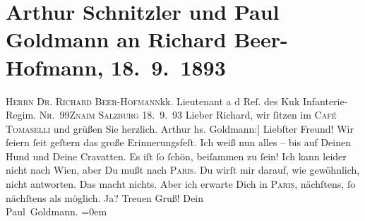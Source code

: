 

         
         \renewcommand{\erwaehntePersonen}{Personen: Richard Beer-Hofmann}
         \renewcommand{\erwaehnteOrte}{Orte: Café Tomaselli, I., Innere Stadt, Paris, Salzburg, Wien, Wollzeile, Znaim}
         \renewcommand{\erwaehnteWerke}{}
               \section[Arthur Schnitzler und Paul Goldmann an Richard Beer-Hofmann, 18. 9. 1893]{ Arthur Schnitzler und Paul Goldmann an Richard Beer-Hofmann,
                    18. 9. 1893}\nopagebreak{}\rehead{ }\begin{ledgroupsized}[t]{13cm}\normalsize\beginnumbering \toendnotes[C]{\smallbreak\pagebreak[2]} 
\pstart{}{\pb}\textsc{Herrn Dr. Richard Beer-Hofmann}\pend{}\pstart{}kk. Lieutenant a d Reſ. des Kuk Infanterie-Regim. \textsc{Nr. 99}\pend{}\pstart{}\textsc{Znaim}\pend{}{\bigskip}\pstart
           \raggedleft{}{\pb}\textsc{Salzburg} 18. 9. 93\pend
           \pstart{}Lieber Richard,\pend\pstart
           wir ſitzen im \textsc{Café Tomaselli} und grüßen Sie herzlich.\pend
           \pstart \spacefill\mbox{Arthur}\pend{}\pstart
           \noindent{}{[}hs. Goldmann:{]} Liebſter Freund!\pend
           \pstart
           Wir feiern ſeit geſtern das große Erinnerungsfeſt. Ich weiß nun alles – bis auf
                    Deinen Hund und Deine Cravatten. Es iſt ſo ſchön, beiſammen zu ſein!\pend
           \pstart
           Ich kann leider nicht nach Wien, aber Du mußt
                    nach \textsc{Paris}. Du wirſt mir darauf, wie gewöhnlich, nicht antworten. Das macht nichts.
                    Aber ich  erwarte Dich in \textsc{Paris}, nächſtens, ſo nächſtens als möglich. Ja? Treuen Gruß!\pend
           \pstart
           Dein{\\[\baselineskip]}\spacefill\mbox{Paul Goldmann.}\pend
           \leftskip=0em{}
         

\end{ledgroupsized}
